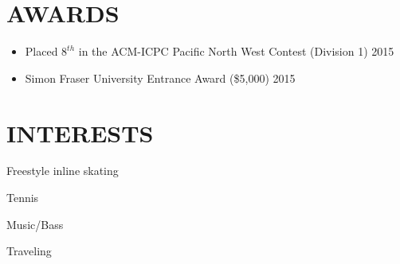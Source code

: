 \documentclass[11pt]{article} %
\begin{document}

\vspace{-2mm}
\section{AWARDS}
\begin{itemize}[leftmargin=10mm]
    \item Placed $8^{th}$ in the ACM-ICPC Pacific North West Contest (Division 1) \hfill 2015
    \item \vspace{-1mm}Simon Fraser University Entrance Award (\$5,000) \hfill 2015
\end{itemize}


\section{INTERESTS}
\begin{itemize}[leftmargin=10mm]
\begin{minipage}{0.5\linewidth}
    \item Freestyle inline skating
	\vspace{-1mm}
    \item Tennis
\end{minipage}
\begin{minipage}{0.5\linewidth}
    \item Music/Bass	
    \vspace{-1mm}
    \item Traveling
\end{minipage}
\end{itemize}
\end{document}
